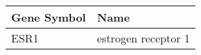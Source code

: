 \begin{tabular}{ll}
\toprule
Gene Symbol &                Name \\
\midrule
       ESR1 & estrogen receptor 1 \\
\bottomrule
\end{tabular}
